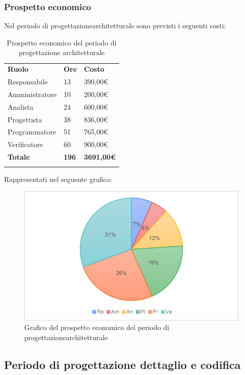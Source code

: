 \subsubsection{Prospetto economico}
Nel periodo di progettazione\glosp architetturale sono previsti i seguenti costi:
\begin{longtable} {
		>{}p{32mm}
		>{}p{20mm}
		>{}p{20mm}
	}
	\rowcolor{gray!50}
	
	\textbf{Ruolo} & \textbf{Ore} & \textbf{Costo} \TBstrut \\
	Responsabile & 13 & 390,00\euro{} \TBstrut \\
	Amministratore & 10 & 200,00\euro{} \TBstrut \\
	Analista & 24 & 600,00\euro{} \TBstrut \\
	Progettista & 38 & 836,00\euro{} \TBstrut \\
	Programmatore & 51 & 765,00\euro{} \TBstrut \\
	Verificatore & 60 & 900,00\euro{} \TBstrut \\
	\textbf{Totale} & \textbf{196}& \textbf{3691,00\euro{}} \TBstrut \\	
	\rowcolor{white}
	\caption{Prospetto economico del periodo di progettazione architetturale}
\end{longtable}
\pagebreak
Rappresentati nel seguente grafico:
\begin{figure}[H] 
	\includegraphics[width=\linewidth]{./img/Grafici/4.png}
	\caption{Grafico del prospetto economico del periodo di progettazione\glosp architetturale}
\end{figure}
\pagebreak
\subsection{Periodo di progettazione dettaglio e codifica}
